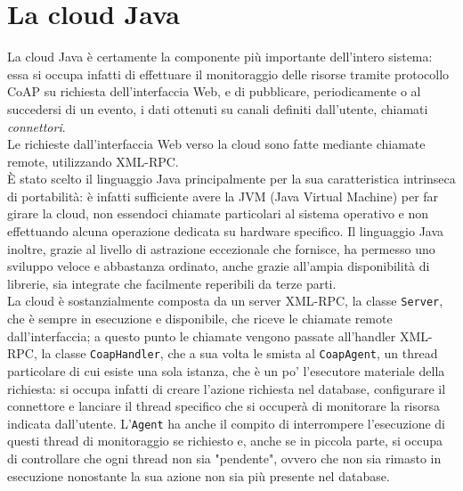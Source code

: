 \section{La cloud Java}
La cloud Java è certamente la componente più importante dell'intero sistema: essa si occupa infatti di effettuare il monitoraggio delle risorse tramite protocollo CoAP su richiesta dell'interfaccia Web, e di pubblicare, periodicamente o al succedersi di un evento, i dati ottenuti su canali definiti dall'utente, chiamati \textit{connettori}.
\\Le richieste dall'interfaccia Web verso la cloud sono fatte mediante chiamate remote, utilizzando XML-RPC.
\\È stato scelto il linguaggio Java principalmente per la sua caratteristica intrinseca di portabilità: è infatti sufficiente avere la JVM (Java Virtual Machine) per far girare la cloud, non essendoci chiamate particolari al sistema operativo e non effettuando alcuna operazione dedicata su hardware specifico. Il linguaggio Java inoltre, grazie al livello di astrazione eccezionale che fornisce, ha permesso uno sviluppo veloce e abbastanza ordinato, anche grazie all'ampia disponibilità di librerie, sia integrate che facilmente reperibili da terze parti. 
\\La cloud è sostanzialmente composta da un server XML-RPC, la classe {\tt Server}, che è sempre in esecuzione e disponibile, che riceve le chiamate remote dall'interfaccia; a questo punto le chiamate vengono passate all'handler XML-RPC, la classe {\tt CoapHandler}, che a sua volta le smista al {\tt CoapAgent}, un thread particolare di cui esiste una sola istanza, che è un po' l'esecutore materiale della richiesta: si occupa infatti di creare l'azione richiesta nel database, configurare il connettore e lanciare il thread specifico che si occuperà di monitorare la risorsa indicata dall'utente. L'{\tt Agent} ha anche il compito di interrompere l'esecuzione di questi thread di monitoraggio se richiesto e, anche se in piccola parte, si occupa di controllare che ogni thread non sia "pendente", ovvero che non sia rimasto in esecuzione nonostante la sua azione non sia più presente nel database.
